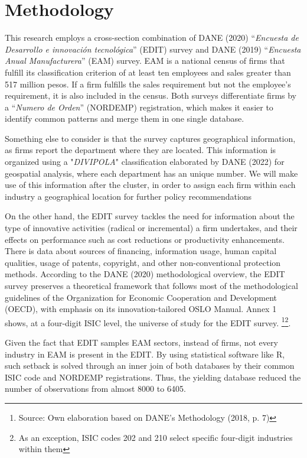 \documentclass[12pt,a4paper]{article}
\begin{document}
\section{Methodology}

This research employs a cross-section combination of DANE (2020) “\textit{Encuesta de Desarrollo e innovación tecnológica}” (EDIT) survey and DANE (2019) “\textit{Encuesta Anual Manufacturera}” (EAM) survey. EAM is a national census of firms that fulfill its classification criterion of at least ten employees and sales greater than 517 million pesos. If a firm fulfills the sales requirement but not the employee's requirement, it is also included in the census. Both surveys differentiate firms by a “\textit{Numero de Orden}” (NORDEMP) registration, which makes it easier to identify common patterns and merge them in one single database. 

Something else to consider is that the survey captures geographical information, as firms report the department where they are located. This information is organized using a "\textit{DIVIPOLA}" classification elaborated by DANE (2022) for geospatial analysis, where each department has an unique number. We will make use of this information after the cluster, in order to assign each firm within each industry a geographical location for further policy recommendations

On the other hand, the EDIT survey tackles the need for information about the type of innovative activities (radical or incremental) a firm undertakes, and their effects on performance such as cost reductions or productivity enhancements. There is data about sources of financing, information usage, human capital qualities, usage of patents, copyright, and other non-conventional protection methods. According to the DANE (2020) methodological overview, the EDIT survey preserves a theoretical framework that follows most of the methodological guidelines of the Organization for Economic Cooperation and Development (OECD), with emphasis on its innovation-tailored OSLO Manual. Annex 1 shows, at a four-digit ISIC level, the universe of study for the EDIT survey.  \footnote{Source: Own elaboration based on DANE's Methodology (2018, p. 7)}\footnote{As an exception, ISIC codes 202 and 210 select specific four-digit industries within them}. 

Given the fact that EDIT samples EAM sectors, instead of firms, not every industry in EAM is present in the EDIT. By using statistical software like R, such setback is solved through an inner join of both databases by their common ISIC code and NORDEMP registrations. Thus, the yielding database reduced the number of observations from almost 8000 to 6405.  
\end{document}
